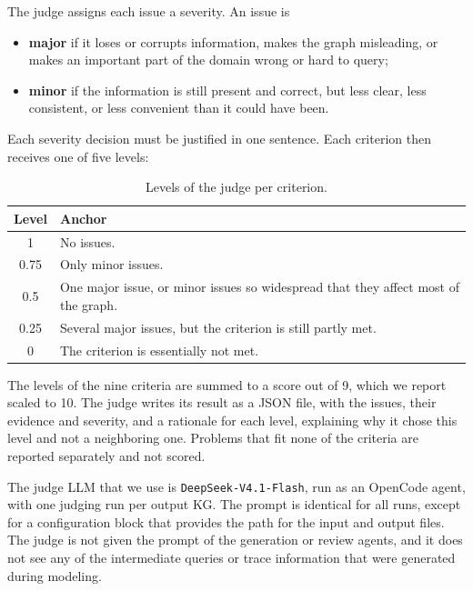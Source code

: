 The judge assigns each issue a severity. An issue is 
\begin{itemize}[leftmargin=*, itemsep=2pt]
  \item \textbf{major} if it loses or corrupts information, makes the graph misleading, or makes an important part of the domain wrong or hard to query;
  \item \textbf{minor} if the information is still present and correct, but less clear, less consistent, or less convenient than it could have been.
\end{itemize}

Each severity decision must be justified in one sentence. Each criterion then receives one of five levels:
\begin{table}[!htbp]
  \centering
  \small
  \renewcommand{\arraystretch}{1.3}
  \begin{tabular}{c l}
    \hline
    \textbf{Level} & \textbf{Anchor} \\
    \hline
    1    & No issues. \\
    0.75 & Only minor issues. \\
    0.5  & One major issue, or minor issues so widespread that they affect most of the graph. \\
    0.25 & Several major issues, but the criterion is still partly met. \\
    0    & The criterion is essentially not met. \\
    \hline
  \end{tabular}
  \caption{Levels of the judge per criterion.}
  \label{tab:judge-levels}
\end{table}

The levels of the nine criteria are summed to a score out of 9, which we report scaled to 10. The judge writes its result as a JSON file, with the issues, their evidence and severity, and a rationale for each level, explaining why it chose this level and not a neighboring one. Problems that fit none of the criteria are reported separately and not scored.

The judge LLM that we use is \texttt{DeepSeek-V4.1-Flash}, run as an OpenCode agent, with one judging run per output KG\@. The prompt is identical for all runs, except for a configuration block that provides the path for the input and output files. The judge is not given the prompt of the generation or review agents, and it does not see any of the intermediate queries or trace information that were generated during modeling.

